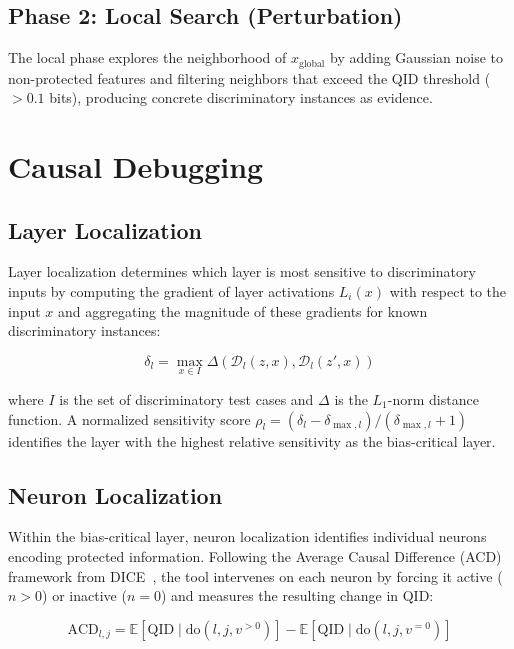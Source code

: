 \subsection{Phase 2: Local Search (Perturbation)}

The local phase explores the neighborhood of $x_{\text{global}}$ by adding Gaussian noise to non-protected features and filtering neighbors that exceed the QID threshold ($> 0.1$ bits), producing concrete discriminatory instances as evidence.

\section{Causal Debugging}

\subsection{Layer Localization}

Layer localization determines which layer is most sensitive to discriminatory inputs by computing the gradient of layer activations $L_i(x)$ with respect to the input $x$ and aggregating the magnitude of these gradients for known discriminatory instances:

\begin{equation}
    \delta_l = \max_{x \in I} \Delta\left(\mathcal{D}_l(z, x), \mathcal{D}_l(z', x)\right)
    \label{eq:layer_sensitivity}
\end{equation}

where $I$ is the set of discriminatory test cases and $\Delta$ is the $L_1$-norm distance function. A normalized sensitivity score $\rho_l = (\delta_l - \delta_{\max,l}) / (\delta_{\max,l} + 1)$ identifies the layer with the highest relative sensitivity as the bias-critical layer.

\subsection{Neuron Localization}

Within the bias-critical layer, neuron localization identifies individual neurons encoding protected information. Following the Average Causal Difference (ACD) framework from DICE~\cite{dice}, the tool intervenes on each neuron by forcing it active ($n > 0$) or inactive ($n = 0$) and measures the resulting change in QID:

\begin{equation}
    \text{ACD}_{l,j} = \mathbb{E}\left[\text{QID} \mid \text{do}(l, j, v^{>0})\right] - \mathbb{E}\left[\text{QID} \mid \text{do}(l, j, v^{=0})\right]
    \label{eq:acd}
\end{equation}

